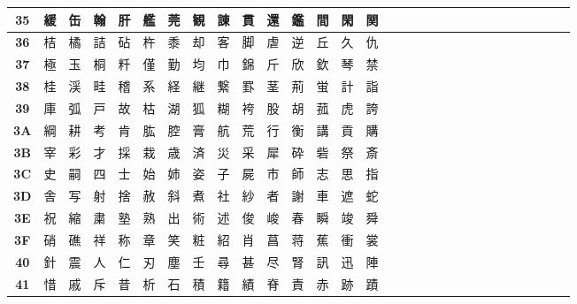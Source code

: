 \begin{table}[H]
\begin{tabular}{|Sc|Sc|Sc|Sc|Sc|Sc|Sc|Sc|Sc|Sc|Sc|Sc|Sc|Sc|Sc|}
\textbf{35} & 緩 & 缶 & 翰 & 肝 & 艦 & 莞 & 観 & 諌 & 貫 & 還 & 鑑 & 間 & 閑 & 関 \\ \hline
\textbf{36} & 桔 & 橘 & 詰 & 砧 & 杵 & 黍 & 却 & 客 & 脚 & 虐 & 逆 & 丘 & 久 & 仇 \\ \hline
\textbf{37} & 極 & 玉 & 桐 & 粁 & 僅 & 勤 & 均 & 巾 & 錦 & 斤 & 欣 & 欽 & 琴 & 禁 \\ \hline
\textbf{38} & 桂 & 渓 & 畦 & 稽 & 系 & 経 & 継 & 繋 & 罫 & 茎 & 荊 & 蛍 & 計 & 詣 \\ \hline
\textbf{39} & 庫 & 弧 & 戸 & 故 & 枯 & 湖 & 狐 & 糊 & 袴 & 股 & 胡 & 菰 & 虎 & 誇 \\ \hline
\textbf{3A} & 綱 & 耕 & 考 & 肯 & 肱 & 腔 & 膏 & 航 & 荒 & 行 & 衡 & 講 & 貢 & 購 \\ \hline
\textbf{3B} & 宰 & 彩 & 才 & 採 & 栽 & 歳 & 済 & 災 & 采 & 犀 & 砕 & 砦 & 祭 & 斎 \\ \hline
\textbf{3C} & 史 & 嗣 & 四 & 士 & 始 & 姉 & 姿 & 子 & 屍 & 市 & 師 & 志 & 思 & 指 \\ \hline
\textbf{3D} & 舎 & 写 & 射 & 捨 & 赦 & 斜 & 煮 & 社 & 紗 & 者 & 謝 & 車 & 遮 & 蛇 \\ \hline
\textbf{3E} & 祝 & 縮 & 粛 & 塾 & 熟 & 出 & 術 & 述 & 俊 & 峻 & 春 & 瞬 & 竣 & 舜 \\ \hline
\textbf{3F} & 硝 & 礁 & 祥 & 称 & 章 & 笑 & 粧 & 紹 & 肖 & 菖 & 蒋 & 蕉 & 衝 & 裳 \\ \hline
\textbf{40} & 針 & 震 & 人 & 仁 & 刃 & 塵 & 壬 & 尋 & 甚 & 尽 & 腎 & 訊 & 迅 & 陣 \\ \hline
\textbf{41} & 惜 & 戚 & 斥 & 昔 & 析 & 石 & 積 & 籍 & 績 & 脊 & 責 & 赤 & 跡 & 蹟 \\ \hline
\end{tabular}
\end{table}

